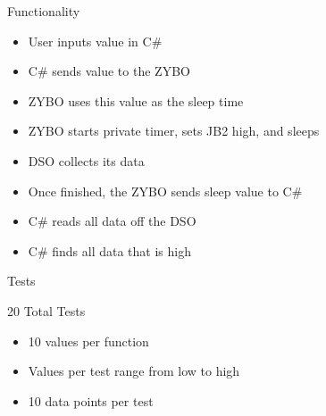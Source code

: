 \documentclass[pdf]{beamer}
\begin{document}
\begin{frame}{Functionality}

  \begin{itemize}
  \item User inputs value in C\#
  \item C\# sends value to the ZYBO
  \end{itemize}
  
  \pause

  \begin{itemize}
  \item ZYBO uses this value as the sleep time
  \item ZYBO starts private timer, sets JB2 high, and sleeps
  \item DSO collects its data
  \end{itemize}
  
  \pause
  
  \begin{itemize}
  \item Once finished, the ZYBO sends sleep value to C\#
  \item C\# reads all data off the DSO
  \item C\# finds all data that is high
  \end{itemize}

\end{frame}

\begin{frame}{Tests}

  20 Total Tests
  \begin{itemize}
  \item 10 values per function
  \item Values per test range from low to high
  \item 10 data points per test
  \end{itemize}
    
\end{frame}
\end{document}
